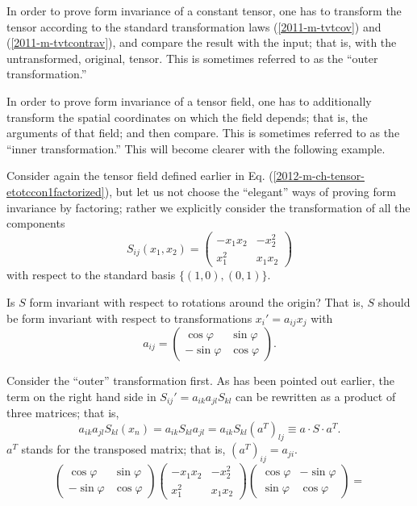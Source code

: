 In order to prove form invariance of a constant tensor,
one has to transform the tensor according to the standard transformation laws
(\ref{2011-m-tvtcov}) and (\ref{2011-m-tvtcontrav}), and compare the result with the input;
that is, with the untransformed, original, tensor.
This is sometimes referred to as the ``outer transformation.''


In order to prove form invariance of a tensor field,
one has to additionally transform the spatial coordinates on which the field depends;
that is, the arguments of that field; and then compare.
This is sometimes referred to as the ``inner transformation.''
This will become clearer with the following example.

{
\color{blue}
\bexample


Consider again the tensor field defined
earlier in Eq.
(\ref{2012-m-ch-tensor-etotccon1factorized}),
but let us not choose the ``elegant''
ways of proving form invariance by factoring; rather we explicitly
consider the transformation of all the  components
$$S_{ij}(x_1,x_2)
=
\begin{pmatrix}
 -x_1x_2 & - x_2^2  \\
 x_1^2 & x_1x_2
\end{pmatrix}
$$
with respect to the standard basis  $\{(1,0), (0,1)\}$.

Is $S$ form invariant with respect to rotations around the origin?
That is, $S$ should be form invariant with respect to transformations
$x_i' = a_{ij} x_j$
with
$$
a_{ij}=\begin{pmatrix}
 \cos \varphi & \sin \varphi  \\
  -\sin \varphi & \cos \varphi
\end{pmatrix}.
$$


Consider the ``outer'' transformation first.
As has been pointed out earlier,
the term on the right hand side in $
S_{ij}'= a_{ik}a_{jl}S_{kl}
$
can be rewritten as a product of three matrices; that is,
$$
a_{ik}a_{jl}S_{kl}\left(x_n\right)
=  a_{ik}S_{kl}a_{jl}
=  a_{ik}S_{kl}\left(a^T \right)_{lj}
\equiv a\cdot S\cdot a^T .
$$
$a^T$ stands for the transposed matrix; that is,
$(a^T)_{ij}=a_{ji}$.
$$
  \left(
    \begin{array}{cc}
      \cos \varphi  & \sin \varphi \\
      -\sin \varphi & \cos \varphi
    \end{array}
  \right)
  \left(
    \begin{array}{cc}
      -x_1x_2 & -x_2^2 \\
      x_1^2   & x_1x_2
    \end{array}
  \right)
  \left(
    \begin{array}{cc}
      \cos \varphi  & -\sin \varphi \\
      \sin \varphi & \cos \varphi
    \end{array}
  \right)=
$$

}
